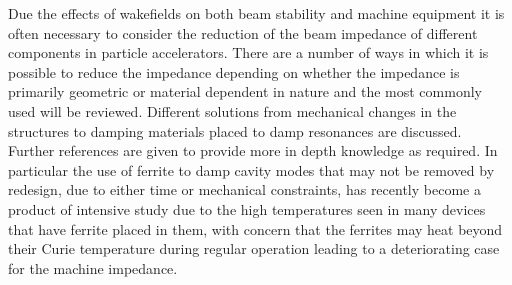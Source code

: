 Due the effects of wakefields on both beam stability and machine equipment it is often necessary to consider the reduction of the beam impedance of different components in particle accelerators. There are a number of ways in which it is possible to reduce the impedance depending on whether the impedance is primarily geometric or material dependent in nature and the most commonly used will be reviewed. Different solutions from mechanical changes in the structures to damping materials placed to damp resonances are discussed. Further references are given to provide more in depth knowledge as required. In particular the use of ferrite to damp cavity modes that may not be removed by redesign, due to either time or mechanical constraints, has recently become a product of intensive study due to the high temperatures seen in many devices that have ferrite placed in them, with concern that the ferrites may heat beyond their Curie temperature during regular operation leading to a deteriorating case for the machine impedance. 